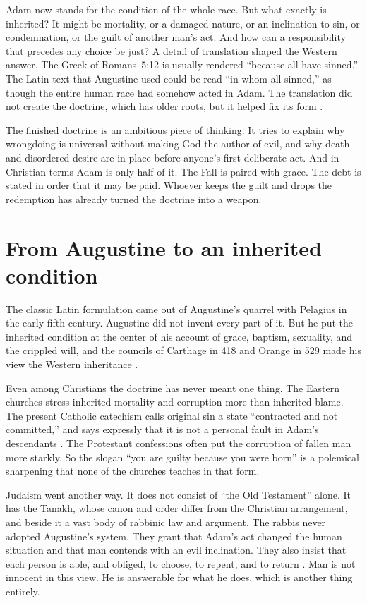 \documentclass[12pt,a4paper]{book}
\begin{document}
Adam now stands for the condition of the whole race. But what exactly is inherited? It might be mortality, or a damaged nature, or an inclination to sin, or condemnation, or the guilt of another man's act. And how can a responsibility that precedes any choice be just? A detail of translation shaped the Western answer. The Greek of Romans~5:12 is usually rendered ``because all have sinned.'' The Latin text that Augustine used could be read ``in whom all sinned,'' as though the entire human race had somehow acted in Adam. The translation did not create the doctrine, which has older roots, but it helped fix its form \cite{BeatriceTransmissionSin2013}.

The finished doctrine is an ambitious piece of thinking. It tries to explain why wrongdoing is universal without making God the author of evil, and why death and disordered desire are in place before anyone's first deliberate act. And in Christian terms Adam is only half of it. The Fall is paired with grace. The debt is stated in order that it may be paid. Whoever keeps the guilt and drops the redemption has already turned the doctrine into a weapon.

\section{From Augustine to an inherited condition}

The classic Latin formulation came out of Augustine's quarrel with Pelagius in the early fifth century. Augustine did not invent every part of it. But he put the inherited condition at the center of his account of grace, baptism, sexuality, and the crippled will, and the councils of Carthage in 418 and Orange in 529 made his view the Western inheritance \cite{BeatriceTransmissionSin2013,TimpeChristianSin2021}.

Even among Christians the doctrine has never meant one thing. The Eastern churches stress inherited mortality and corruption more than inherited blame. The present Catholic catechism calls original sin a state ``contracted and not committed,'' and says expressly that it is not a personal fault in Adam's descendants \cite[paras.~404--406]{CatechismOriginalSin}. The Protestant confessions often put the corruption of fallen man more starkly. So the slogan ``you are guilty because you were born'' is a polemical sharpening that none of the churches teaches in that form.

Judaism went another way. It does not consist of ``the Old Testament'' alone. It has the Tanakh, whose canon and order differ from the Christian arrangement, and beside it a vast body of rabbinic law and argument. The rabbis never adopted Augustine's system. They grant that Adam's act changed the human situation and that man contends with an evil inclination. They also insist that each person is able, and obliged, to choose, to repent, and to return \cite{HaymanRabbinicFall1984}. Man is not innocent in this view. He is answerable for what he does, which is another thing entirely.
\end{document}
